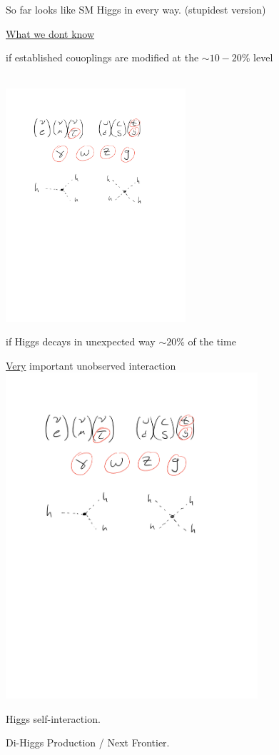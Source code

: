 {\clearpage

So far looks like SM Higgs in every way.  (stupidest version)

\underline{What we dont know}
\bi
\item[-] if established couoplings are modified at the $\sim 10-20$\% level
\item[-] ${ }$\\ \includegraphics[width=0.5\textwidth]{./SMCouplings.pdf}
\item[-] if Higgs decays in unexpected way $\sim 20$\% of the time
\item[-]{ \underline{Very} important unobserved interaction\\
\includegraphics[width=0.7\textwidth]{./HIggsCouplings.pdf}
}
\ei

Higgs self-interaction. 

Di-Higgs Production / Next Frontier.

}



